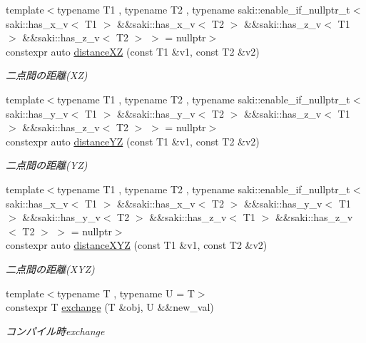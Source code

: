 \begin{DoxyCompactItemize}
{\footnotesize template$<$typename T1 , typename T2 , typename saki\+::enable\+\_\+if\+\_\+nullptr\+\_\+t$<$ saki\+::has\+\_\+x\+\_\+v$<$ T1 $>$ \&\&saki\+::has\+\_\+x\+\_\+v$<$ T2 $>$ \&\&saki\+::has\+\_\+z\+\_\+v$<$ T1 $>$ \&\&saki\+::has\+\_\+z\+\_\+v$<$ T2 $>$ $>$  = nullptr$>$ }\\constexpr auto \mbox{\hyperlink{namespacesaki_a6bd1999d77d0ba6f6101747d82593c66}{distance\+XZ}} (const T1 \&v1, const T2 \&v2)
\begin{DoxyCompactList}\small\item\em 二点間の距離(\+X\+Z) \end{DoxyCompactList}\item 
{\footnotesize template$<$typename T1 , typename T2 , typename saki\+::enable\+\_\+if\+\_\+nullptr\+\_\+t$<$ saki\+::has\+\_\+y\+\_\+v$<$ T1 $>$ \&\&saki\+::has\+\_\+y\+\_\+v$<$ T2 $>$ \&\&saki\+::has\+\_\+z\+\_\+v$<$ T1 $>$ \&\&saki\+::has\+\_\+z\+\_\+v$<$ T2 $>$ $>$  = nullptr$>$ }\\constexpr auto \mbox{\hyperlink{namespacesaki_a708a45bd2134a3a276e7acb2566eb8c1}{distance\+YZ}} (const T1 \&v1, const T2 \&v2)
\begin{DoxyCompactList}\small\item\em 二点間の距離(\+Y\+Z) \end{DoxyCompactList}\item 
{\footnotesize template$<$typename T1 , typename T2 , typename saki\+::enable\+\_\+if\+\_\+nullptr\+\_\+t$<$ saki\+::has\+\_\+x\+\_\+v$<$ T1 $>$ \&\&saki\+::has\+\_\+x\+\_\+v$<$ T2 $>$ \&\&saki\+::has\+\_\+y\+\_\+v$<$ T1 $>$ \&\&saki\+::has\+\_\+y\+\_\+v$<$ T2 $>$ \&\&saki\+::has\+\_\+z\+\_\+v$<$ T1 $>$ \&\&saki\+::has\+\_\+z\+\_\+v$<$ T2 $>$ $>$  = nullptr$>$ }\\constexpr auto \mbox{\hyperlink{namespacesaki_af202425b916b22c2b3a26731689d5c21}{distance\+X\+YZ}} (const T1 \&v1, const T2 \&v2)
\begin{DoxyCompactList}\small\item\em 二点間の距離(\+X\+Y\+Z) \end{DoxyCompactList}\item 
{\footnotesize template$<$typename T , typename U  = T$>$ }\\constexpr T \mbox{\hyperlink{namespacesaki_ace0188c33098d6ac615fc71e64ab6dda}{exchange}} (T \&obj, U \&\&new\+\_\+val)
\begin{DoxyCompactList}\small\item\em コンパイル時exchange \end{DoxyCompactList}\item 

\end{DoxyCompactItemize}
